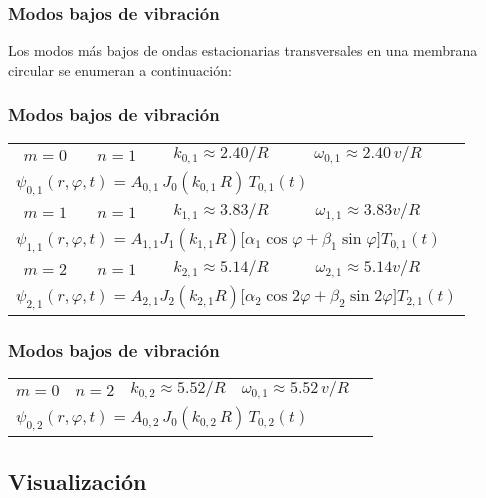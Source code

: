 \documentclass[12pt]{beamer}
\begin{document}
\begin{frame}
\frametitle{Modos bajos de vibración}
Los modos más bajos de ondas estacionarias transversales en una membrana circular se enumeran a continuación:
\end{frame}
\begin{frame}
\frametitle{Modos bajos de vibración}
\fontsize{10}{10}\selectfont
\begin{table}[H]
\centering
\begin{tabular}{c c c c l}
$m {=} 0$ & $n {=} 1$ & $k_{0,1} {\approx} 2.40/R$ & $\omega_{0,1} {\approx} 2.40 \, v/R$ & \\[0.5em] 
\multicolumn{5}{l}{$\psi_{0,1}(r, \varphi, t) {=} A_{0,1} \, J_{0}(k_{0,1} \, R) \, T_{0,1}(t)$} \\[0.5em] \hline \pause
$m {=} 1$ & $n {=} 1$ & $k_{1,1} {\approx} 3.83/R$ & $\omega_{1,1} {\approx} 3.83 v/R$ & \\[0.5em]
\multicolumn{5}{l}{$\psi_{1,1}(r, \varphi, t) {=} A_{1,1} J_{1}(k_{1,1} R) \big[ \alpha_{1} \cos \varphi {+} \beta_{1} \sin \varphi \big] T_{0,1}(t)$} \\[0.5em] \hline \pause
$m {=} 2$ & $n {=} 1$ & $k_{2,1} {\approx} 5.14/R$ & $\omega_{2,1} {\approx} 5.14 v/R$ & \\[0.5em]
\multicolumn{5}{l}{$\psi_{2,1}(r, \varphi, t) {=} A_{2,1} J_{2}(k_{2,1} R) \big[ \alpha_{2} \cos 2 \varphi {+} \beta_{2} \sin 2 \varphi \big] T_{2,1}(t)$}
\end{tabular}
\end{table}
\end{frame}
\begin{frame}
\frametitle{Modos bajos de vibración}
\fontsize{10}{10}\selectfont
\begin{table}[H]
\centering
\begin{tabular}{c c c c l}
$m {=} 0$ & $n {=} 2$ & $k_{0,2} {\approx} 5.52/R$ & $\omega_{0,1} {\approx} 5.52 \, v/R$ & \\[0.5em]
\multicolumn{5}{l}{$\psi_{0,2}(r, \varphi, t) {=} A_{0,2} \, J_{0}(k_{0,2} \, R) \, T_{0,2}(t)$}
\end{tabular}
\end{table}
\end{frame}

\subsection{Visualización}
\end{document}
